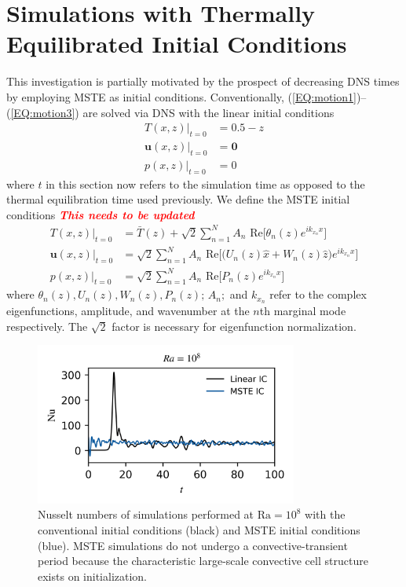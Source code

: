 \documentclass[reprint,amsmath,amssymb,aps]{revtex4-1}
\newcommand{\note}[1]{\noindent \textbf{\textit{\textcolor{Red}{#1}}}}
\newcommand\Ra{\mathrm{Ra}}
\newcommand{\eqss}[2]{(\ref{#1})--(\ref{#2})}
\begin{document}
\section{Simulations with Thermally Equilibrated Initial Conditions}
This investigation is partially motivated by the prospect of decreasing DNS times by employing MSTE as initial conditions. 
Conventionally, \eqss{EQ:motion1}{EQ:motion3} are solved via DNS with the linear initial conditions
\begin{align}
    T(x, z)\big|_{t=0} &= 0.5 - z \nonumber \\
    \mathbf{u}(x, z)\big|_{t=0} &= \mathbf{0} \nonumber \\
    p(x, z)\big|_{t=0} &= 0 \label{EQ:linear_ic}
\end{align}
where $t$ in this section now refers to the simulation time as opposed to the thermal equilibration time used previously. 
We define the MSTE initial conditions
\note{This needs to be updated}
\begin{align}
    T(x, z)\big|_{t=0} &= \bar{T}(z) + \sqrt{2} \sum_{n=1}^N  A_n \text{ Re} \Big[ \theta_n(z) e^{ik_{x_n}x} \Big] \nonumber \\
    \mathbf{u}(x, z)\big|_{t=0} &= \sqrt{2} \sum_{n=1}^N A_n \text{ Re} \Big[\Big( U_n (z) \hat{x} + W_n(z) \hat{z} \Big) e^{ik_{x_n}x} \Big] \nonumber\\
    p(x, z)\big|_{t=0} &= \sqrt{2} \sum_{n=1}^N A_n \text{ Re} \Big[P_n (z) e^{ik_{x_n}x}\Big] \label{EQ:mste_ic}
\end{align}
where $\theta_n(z), U_n(z), W_n(z), P_n(z); \, A_n; $ and $k_{x_n}$ refer to the complex eigenfunctions, amplitude, and wavenumber at the $n$th marginal mode respectively. 
The $\sqrt{2}$ factor is necessary for eigenfunction normalization. 

\begin{figure}
    \begin{minipage}{3.4in}
        \centering
        \includegraphics[width=3.4in]{sim_eq_nu.png}
        \caption{Nusselt numbers of simulations performed at $\Ra = 10^8$ with the conventional initial conditions (black) and MSTE initial conditions (blue). 
        MSTE simulations do not undergo a convective-transient period because the characteristic large-scale convective cell structure exists on initialization.}
        \label{fig:nu_sim}
    \end{minipage}
\end{figure}
\end{document}
